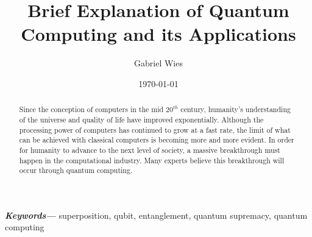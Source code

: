\documentclass[12pt]{article}   	%
\title{Brief Explanation of Quantum Computing and its Applications}
\author{Gabriel Wies}
\date{\today}
\providecommand{\keywords}[1]
{
  \small	
  \textbf{\textit{Keywords---}} #1
}
\begin{document}
\maketitle

\begin{abstract}
Since the conception of computers in the mid $20^{th}$ century, humanity's understanding of the universe and quality of life have improved exponentially. Although the processing power of computers has continued to grow at a fast rate, the limit of what can be achieved with classical computers is becoming more and more evident. In order for humanity to advance to the next level of society, a massive breakthrough must happen in the computational industry. Many experts believe this breakthrough will occur through quantum computing.
\end{abstract}

\keywords{superposition, qubit, entanglement, quantum supremacy, quantum computing}

\doublespacing
\end{document}
